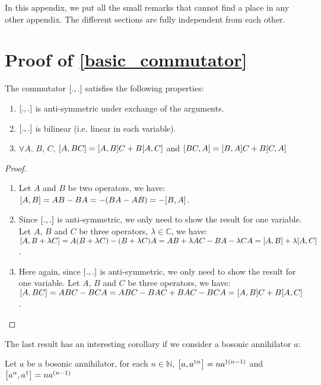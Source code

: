 In this appendix, we put all the small remarks that cannot find a place in any other appendix. The different sections are fully independent from each other.

\section{Proof of \autoref{basic_commutator}} \label{proof-basic-commutator}

\begin{theorem}
    The commutator $\commutator{.}{.}$ satisfies the following properties:
    \begin{enumerate}
        \item $\commutator{.}{.}$ is anti-symmetric under exchange of the arguments.
        \item $\commutator{.}{.}$ is bilinear (i.e. linear in each variable).
        \item $\forall A$, $B$, $C$, $\commutator{A}{B C} = \commutator{A}{B} C + B \commutator{A}{C}$ and $\commutator{B C}{A} = \commutator{B}{A} C + B \commutator{C}{A}$
    \end{enumerate}
\end{theorem}

\begin{proof}
    \begin{enumerate}
        \item Let $A$ and $B$ be two operators, we have: $\commutator{A}{B} = A B - B A = - (B A - A B) = -\commutator{B}{A}$.
        \item Since $\commutator{.}{.}$ is anti-symmetric, we only need to show the result for one variable. Let $A$, $B$ and $C$ be three operators, $\lambda \in \mathbb{C}$, we have: $\commutator{A}{B + \lambda C} = A (B + \lambda C) - (B + \lambda C) A = A B + \lambda A C - B A - \lambda C A = \commutator{A}{B} + \lambda \commutator{A}{C}$.
        \item Here again, since $\commutator{.}{.}$ is anti-symmetric, we only need to show the result for one variable. Let $A$, $B$ and $C$ be three operators, we have: $\commutator{A}{B C} = A B C - B C A = A B C - B A C + B A C - B C A = \commutator{A}{B} C + B \commutator{A}{C}$.
    \end{enumerate}
\end{proof}

The last result has an interesting corollary if we consider a bosonic annihilator $a$:

\begin{corollary}
    Let $a$ be a bosonic annihilator, for each $n \in \mathbb{N}$, $\commutator{a}{a^{\dagger n}} = n a^{\dagger (n-1)}$ and $\commutator{a^n}{a^\dagger} = n a^{(n-1)}$
\end{corollary}

